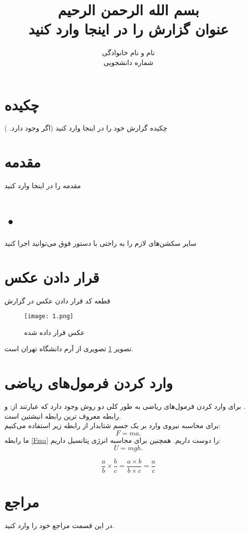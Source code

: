 \documentclass[12pt,a4paper]{report}
\begin{document}
\title{بسم الله الرحمن الرحیم \\عنوان گزارش را در اینجا وارد کنید}
\author{ نام و نام خانوادگی \\ شماره دانشجویی} 
\maketitle

\tableofcontents

\newpage

\section{چکیده}
چکیده گزارش خود را در اینجا وارد کنید (اگر وجود دارد. )

\newpage

\section{مقدمه}

مقدمه را در اینجا وارد کنید

\newpage

\section{•}
سایر سکشن‌های لازم را به راحتی با دستور فوق می‌توانید اجرا کنید

\section{قرار دادن عکس}
قطعه کد قرار دادن عکس در گزارش
\begin{center}
	\begin{figure}[h]
	\centering
	\texttt{[image: 1.png]}
    \caption{عکس قرار داده شده}
    \label{a}
\end{figure}
\end{center}
تصویر \ref{a} تصویری از آرم دانشگاه تهران است. 
\newpage 

\section{وارد کردن فرمول‌های ریاضی }
برای وارد کردن فرمول‌های ریاضی به طور کلی دو روش وجود دارد که عبارتند از:  و  .
\\
رابطه  معروف ترین رابطه انیشتین است.
\\
برای محاسبه نیروی وارد بر یک جسم شتابدار از رابطه زیر استفاده می‌کنیم:
\begin{equation}
	\label{Fma}
	F=ma.
\end{equation}
ما رابطه \eqref{Fma} را دوست داریم.
همچنین برای مجاسبه انرژی پتانسیل داریم:
\begin{equation}
	U=mgh.
\end{equation}

\begin{equation}\label{MyEq}
  \frac{a}{b} \times \frac{b}{c} = \frac{a \times b}{b \times c} = \frac{a}{c}
\end{equation}


\newpage
\section{مراجع}
در این قسمت مراجع خود را وارد کنید.
\end{document}
